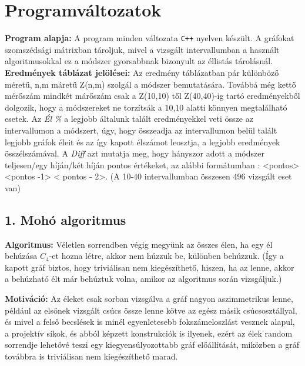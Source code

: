 \documentclass[12pt,a4paper]{article}
\begin{document}
\section*{Programváltozatok}

\textbf{Program alapja:} A program minden változata \texttt{C++} nyelven készült. A gráfokat szomszédsági mátrixban tároljuk, mivel a vizsgált intervallumban a használt algoritmusokkal ez a módszer gyorsabbnak bizonyult az éllistás tárolásnál.
\\[2mm]
\noindent \textbf{Eredmények táblázat jelölései:} Az eredmény táblázatban pár különböző méretű, n,m máretű Z(n,m) szolgál a módszer bemutatására. Továbbá még kettő mérőszám mindkét márőszám csak a Z(10,10) től Z(40,40)-ig tartó eredményekből dolgozik, hogy a módszereket ne torzítsák a 10,10 alatti könnyen megtalálható esetek. Az \emph{Él \%} a legjobb általunk talált eredményekkel veti össze az intervallumon a módszert, úgy, hogy összeadja az intervallumon belül talált legjobb gráfok éleit és az így kapott élszámot leosztja, a legjobb eredmények összélszámával. A \emph{Diff} azt mutatja meg, hogy hányszor adott a módszer teljesen/egy híján/két híján pontos értékeket, az alábbi formátumban : <pontos> <pontos -1> < pontos - 2>. (A 10-40 intervallumban összesen 496 vizsgált eset van)

\subsection*{1. Mohó algoritmus}
\textbf{Algoritmus:} Véletlen sorrendben végig megyünk az összes élen, ha egy él behúzása $C_4$-et hozna létre, akkor nem húzzuk be, különben behúzzuk. (Így a kapott gráf biztos, hogy triviálisan nem kiegészíthető, hiszen, ha az lenne, akkor a behúzható élt már behúztuk volna, amikor az algoritmus során vizsgáljuk.)

\textbf{Motiváció:} Az éleket csak sorban vizsgálva a gráf nagyon aszimmetrikus lenne, például az elsőnek vizsgált csúcs össze lenne kötve az egész másik csúcsosztállyal, és mivel a felső becslések is minél egyenletesebb fokszámeloszlást vesznek alapul, a projektív síkok, és abból képzett konstrukciók is ilyenek, ezért az élek random sorrendje lehetővé teszi egy kiegyensúlyozottabb gráf előállítását, miközben a gráf továbbra is triviálisan nem kiegészíthető marad.
\end{document}
